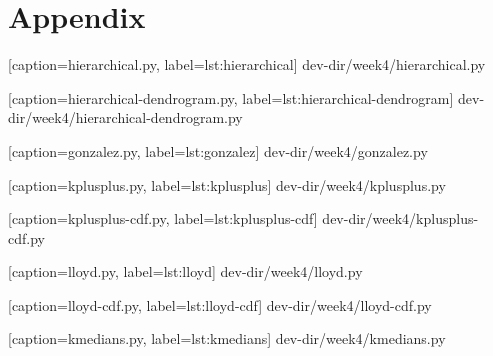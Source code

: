 \documentclass{article}
\begin{document}
\newpage

\section*{Appendix}


  [caption={\sf hierarchical.py}, label={lst:hierarchical}]
  {dev-dir/week4/hierarchical.py}
  
\newpage


  [caption={\sf hierarchical-dendrogram.py}, label={lst:hierarchical-dendrogram}]
  {dev-dir/week4/hierarchical-dendrogram.py}
  
\newpage


  [caption={\sf gonzalez.py}, label={lst:gonzalez}]
  {dev-dir/week4/gonzalez.py}
  
\newpage


  [caption={\sf kplusplus.py}, label={lst:kplusplus}]
  {dev-dir/week4/kplusplus.py}
  
\newpage


  [caption={\sf kplusplus-cdf.py}, label={lst:kplusplus-cdf}]
  {dev-dir/week4/kplusplus-cdf.py}
  
\newpage


  [caption={\sf lloyd.py}, label={lst:lloyd}]
  {dev-dir/week4/lloyd.py}
  
\newpage


  [caption={\sf lloyd-cdf.py}, label={lst:lloyd-cdf}]
  {dev-dir/week4/lloyd-cdf.py}
  
\newpage


  [caption={\sf kmedians.py}, label={lst:kmedians}]
  {dev-dir/week4/kmedians.py}
\end{document}
